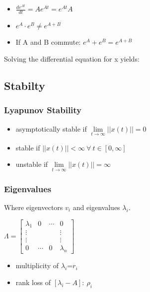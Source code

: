 \documentclass[10pt,a4paper]{scrartcl}
\begin{document}
\begin{multicols*}{3}
\begin{itemize}
\item$\frac{de^{At}}{dt}=Ae^{At}=e^{At}A$
\item $e^A\cdot e^B\neq e^{A+B}$
\item If A and B commute: $e^A+e^B=e^{A+B}$
\end{itemize}

Solving the differential equation for x yields:


\subsection{Stabilty}

\subsubsection{Lyapunov Stability}

\begin{itemize}
\item asymptotically stable if $\lim\limits_{t\rightarrow\infty}||x(t)||=0$
\item stable if $||x(t)||<\infty\ \forall\ t\in[0,\infty]$
\item unstable if $\lim\limits_{t\rightarrow\infty}||x(t)||=\infty$
\end{itemize}

\subsubsection{Eigenvalues}


Where eigenvectors $v_i$ and eigenvalues $\lambda_i$.


$\Lambda =\begin{bmatrix}\lambda_1&0&\cdots&0\\\vdots&&&\vdots\\\vdots&&&\vdots\\0&\cdots&0&\lambda_n\end{bmatrix}$

\begin{itemize}
\item multiplicity of $\lambda_i$=$r_i$
\item rank loss of $[\lambda_i-A]:\ \rho_i$
\end{itemize}


\end{multicols*}
\end{document}
